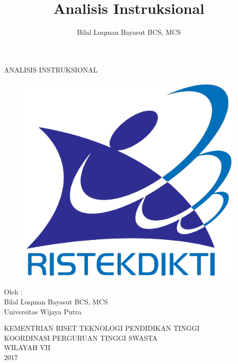\documentclass{article}
\begin{document}
\title{Analisis Instruksional}
\author{Bilal Luqman Bayasut BCS, MCS}

\begin{center}
\huge ANALISIS INSTRUKSIONAL
\end{center}
\vfill
\begin{figure}[h!]
    \begin{center}
        \includegraphics[scale=0.1]{sources/Logo_Kemenristekdikti.png}
        \label{fig:Logo_Kemenristekdikti}
    \end{center}
\end{figure}
\vfill
\begin{center}
    \huge Oleh : \\
        \huge Bilal Luqman Bayasut BCS, MCS \\
        \huge Universitas Wijaya Putra
\end{center}
\vfill
\begin{center}
        \huge KEMENTRIAN RISET TEKNOLOGI PENDIDIKAN TINGGI \\
        \huge KOORDINASI PERGURUAN TINGGI SWASTA \\
        \huge WILAYAH VII \\
        \huge 2017
\end{center}
\end{document}
